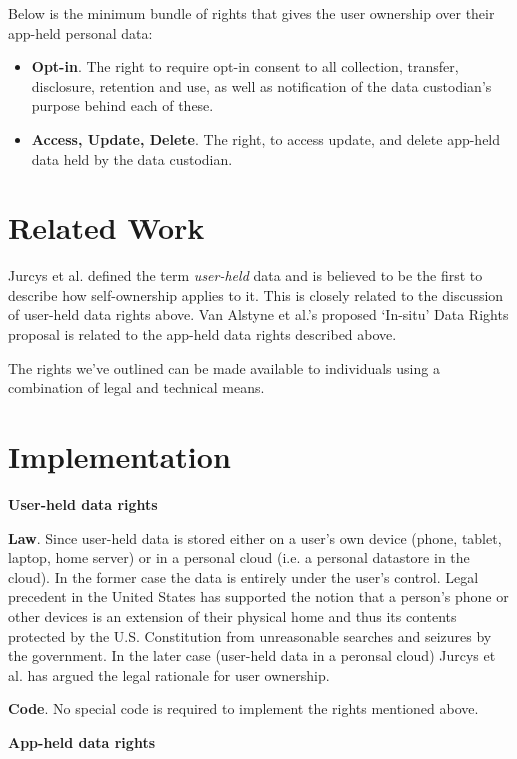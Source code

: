 \documentclass[11pt, oneside]{article}   	%
\begin{document}
Below is the minimum bundle of rights that gives the user ownership over their app-held personal data:
\begin{itemize}
	\item \textbf{Opt-in}. The right to require opt-in consent to all collection, transfer, disclosure, retention and use, as well as notification of the data custodian's purpose behind each of these.
	\item \textbf{Access, Update, Delete}. The right, to access update, and delete app-held data held by the data custodian. 
\end{itemize}

\section{Related Work}

Jurcys et al.\cite{Jurcys2021} defined the term \emph{user-held} data and is believed to be the first to describe how self-ownership applies to it. This is closely related to the discussion of user-held data rights above. Van Alstyne et al.\cite{Alstyne2021}'s proposed `In-situ' Data Rights proposal is related to the app-held data rights described above.

The rights we've outlined can be made available to individuals using a combination of legal and technical means. 

\section{Implementation}

\textbf{User-held data rights}

\textbf{Law}. Since user-held data is stored either on a user's own device (phone, tablet, laptop, home server) or in a personal cloud (i.e. a personal datastore in the cloud). In the former case the data is entirely under the user's control. Legal precedent in the United States has supported the notion that a person's phone or other devices is an extension of their physical home and thus its contents protected by the U.S. Constitution from unreasonable searches and seizures by the government. In the later case (user-held data in a peronsal cloud) Jurcys et al.\cite{Jurcys2021} has argued the legal rationale for user ownership.

\textbf{Code}. No special code is required to implement the rights mentioned above. 

\textbf{App-held data rights}
\end{document}
